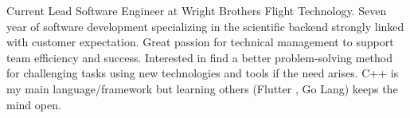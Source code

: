 \begin{cvparagraph}

Current Lead Software Engineer at Wright Brothers Flight Technology. Seven year of software development specializing in the scientific backend strongly linked with customer expectation. 
Great passion for technical management to support team efficiency and success. Interested in find a better problem-solving method for challenging tasks using new technologies and tools if the need arises.
C++ is my main language/framework but learning others (Flutter , Go Lang) keeps the mind open.
\end{cvparagraph}
